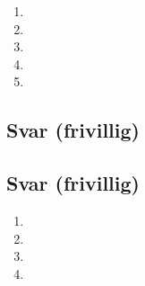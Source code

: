 \documentclass[answers,11pt]{exam}
\begin{document}
\begin{enumerate}[label=\alph*)]
\begin{tcolorbox}
    \begin{enumerate}[label=i\arabic*)]

      \item
      \item

      \item
      \item
      \item

    \end{enumerate}

  \end{tcolorbox}

  \newpage
  

  \begin{tcolorbox}
    \subsection*{Svar (frivillig)}

  \end{tcolorbox}

  \newpage
  

  \begin{tcolorbox}
    \subsection*{Svar (frivillig)}

    \begin{enumerate}[label=k\arabic*)]
      \item

      \item
      \item

      \item

    \end{enumerate}

  \end{tcolorbox}

  \newpage
  


\end{enumerate}
\end{document}
